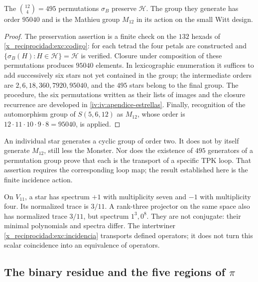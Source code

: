 \begin{proposition}
\label{x_reciprocidad:exc:m12}
The $\binom{12}4=495$ permutations $\sigma_B$ preserve $\mathcal H$.
The group they generate has order $95040$ and is the Mathieu group
$M_{12}$ in its action on the small Witt design.
\end{proposition}

\begin{proof}
The preservation assertion is a finite check on the
$132$ hexads of \eqref{x_reciprocidad:exc:codigo}: for each tetrad the
four petals are constructed and
$\{\sigma_B(H):H\in\mathcal H\}=\mathcal H$ is verified.
Closure under composition of these permutations produces $95040$
elements. In lexicographic enumeration it suffices to add successively
six stars not yet contained in the group; the intermediate orders
are $2,6,18,360,7920,95040$, and the $495$ stars belong to the final
group. The procedure, the six permutations written as their
lists of images and the closure recurrence are developed in
\ref{iv:iv:apendice-estrellas}. Finally, recognition of
the automorphism group of $S(5,6,12)$ as $M_{12}$, whose order is
$12\cdot11\cdot10\cdot9\cdot8=95040$, is applied.
\end{proof}

An individual star generates a cyclic group of order two. It does not
by itself generate $M_{12}$, still less the Monster. Nor does the
existence of $495$ generators of a permutation group prove that
each is the transport of a specific TPK loop. That assertion
requires the corresponding loop map; the result established here
is the finite incidence action.

\begin{remark}
On $V_{11}$, a star has spectrum $+1$ with multiplicity seven
and $-1$ with multiplicity four. Its normalized trace is $3/11$.
A rank-three projector on the same space also has normalized
trace $3/11$, but spectrum $1^3,0^8$. They are not conjugate: their
minimal polynomials and spectra differ. The intertwiner
\eqref{x_reciprocidad:exc:incidencia} transports defined operators; it does not turn
this scalar coincidence into an equivalence of operators.
\end{remark}

\subsection{The binary residue and the five regions of \texorpdfstring{$\pi$}{pi}}
\label{x_reciprocidad:exc:cinco-regiones}

